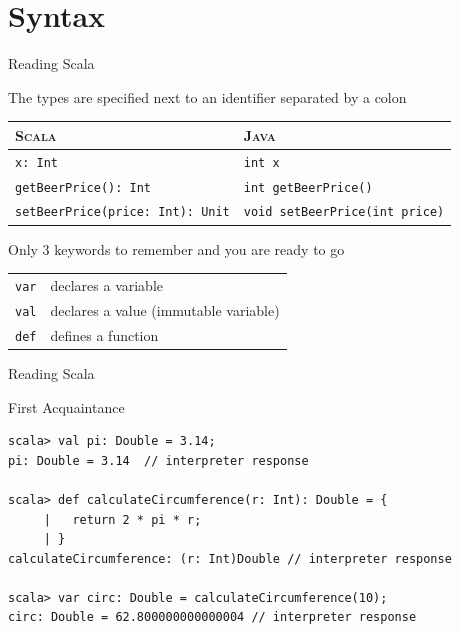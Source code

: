 
\section{Syntax}
\begin{frame}[fragile]{Reading Scala}
\begin{block}{The types are specified next to an identifier separated by a colon}
\begin{tabular}{l|l}
\textsc{Scala} & \textsc{Java}\\
\hline
\lstinline!x: Int! & \lstinline!int x!\\
\lstinline!getBeerPrice(): Int! & \lstinline!int getBeerPrice()!\\
\lstinline!setBeerPrice(price: Int): Unit! & \lstinline!void setBeerPrice(int price)!\\
\end{tabular}
\end{block}
\pause
\begin{block}{Only 3 keywords to remember and you are ready to go}
\begin{tabular}{ll}
\lstinline!var! & declares a variable\\
\lstinline!val! & declares a value (immutable variable)\\
\lstinline!def! & defines a function \\
\end{tabular}
\end{block}
\end{frame}

\begin{frame}[fragile]{Reading Scala}
\begin{exampleblock}{First Acquaintance}
\begin{lstlisting}
scala> val pi: Double = 3.14;
pi: Double = 3.14  // interpreter response

scala> def calculateCircumference(r: Int): Double = {
     |   return 2 * pi * r;
     | }
calculateCircumference: (r: Int)Double // interpreter response

scala> var circ: Double = calculateCircumference(10);
circ: Double = 62.800000000000004 // interpreter response
\end{lstlisting}
\end{exampleblock}
\end{frame}

